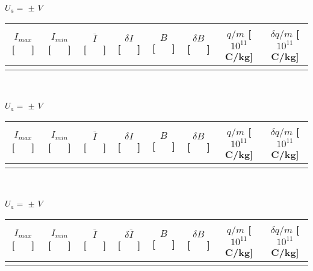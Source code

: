 \documentclass[a4paper,12pt]{article}  %
\begin{document}
\begin{table}[!hbp]
\begin{small}
	\centering

	\noindent	$U_a =$ \underline{\makebox[1.5cm][r]{~}} $\pm$ \underline{\makebox[1cm][r]{~}} $V$ \\
	\begin{tabular}{|c|c|c|c|c|c|c|c|}
	\hline
	 $I_{max}$ [~~~] & $I_{min}$ [~~~] & $\overline{I}$ [~~~]	& $\delta I $ [~~~] & $B$ [~~~] & $\delta B$ [~~~] & $q/m$ [$10^{11}$C/kg] & $\delta q/m$ [$10^{11}$C/kg] \\
	\hline
	 &  &  & &  &  & & \\
	 \hline
 	\end{tabular}\\[10pt]
	\bigskip
	
	\noindent	$U_a =$ \underline{\makebox[1.5cm][r]{~}} $\pm$ \underline{\makebox[1cm][r]{~}} $V$ \\
	\begin{tabular}{|c|c|c|c|c|c|c|c|}
	\hline
	 $I_{max}$ [~~~] & $I_{min}$ [~~~] & $\overline{I}$ [~~~]	& $\delta I $ [~~~] & $B$ [~~~] & $\delta B$ [~~~] & $q/m$ [$10^{11}$C/kg] & $\delta q/m$ [$10^{11}$C/kg] \\
	\hline
	 &  &  & &  &  & & \\
	 \hline
 	\end{tabular}\\[10pt]

	\bigskip
	
	\noindent	$U_a =$ \underline{\makebox[1.5cm][r]{~}} $\pm$ \underline{\makebox[1cm][r]{~}} $V$ \\
	\begin{tabular}{|c|c|c|c|c|c|c|c|}
	\hline
	 $I_{max}$ [~~~] & $I_{min}$ [~~~] & $\overline{I}$ [~~~]	& $\delta \overline{I} $ [~~~] & $B$ [~~~] & $\delta B$ [~~~] & $q/m$ [$10^{11}$C/kg] & $\delta q/m$ [$10^{11}$C/kg] \\
	\hline
	 &  &  & &  &  & & \\
	 \hline
 	\end{tabular}
	
	\label{tab:Dados2}
\end{small}
\end{table}
\end{document}
